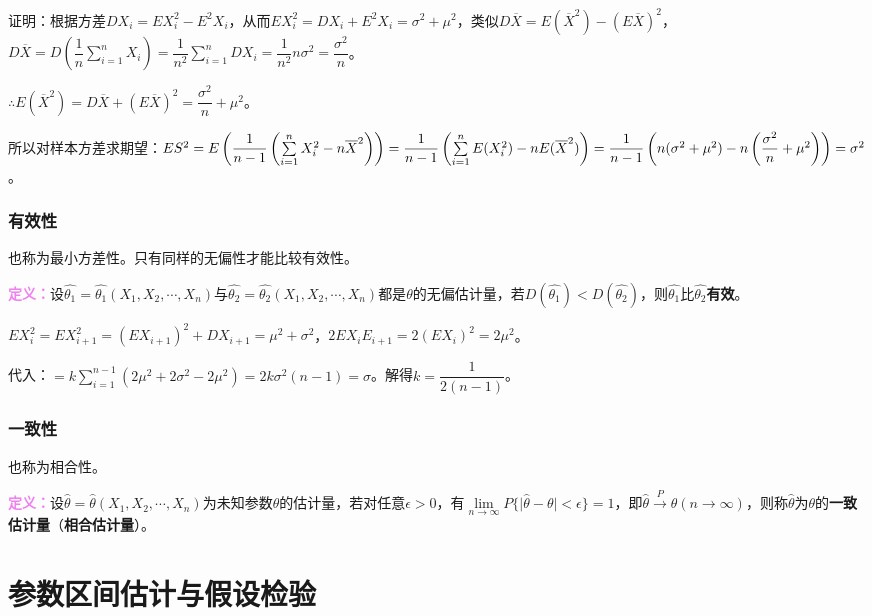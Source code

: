 \documentclass[UTF8, 12pt]{ctexart}
\begin{document}
证明：根据方差$DX_i=EX_i^2-E^2X_i$，从而$EX_i^2=DX_i+E^2X_i=\sigma^2+\mu^2$，类似$D\overline{X}=E(\overline{X}^2)-(E\overline{X})^2$，$D\overline{X}=D\left(\dfrac{1}{n}\sum\limits_{i=1}^nX_i\right)=\dfrac{1}{n^2}\sum\limits_{i=1}^nDX_i=\dfrac{1}{n^2}n\sigma^2=\dfrac{\sigma^2}{n}$。

$\therefore E(\overline{X}^2)=D\overline{X}+(E\overline{X})^2=\dfrac{\sigma^2}{n}+\mu^2$。

所以对样本方差求期望：$ES^2=E\left(\dfrac{1}{n-1}\left(\sum\limits_{i=1}^nX_i^2-n\overline{X}^2\right)\right)=\dfrac{1}{n-1}\\\left(\sum\limits_{i=1}^nE(X_i^2)-nE(\overline{X}^2)\right)=\dfrac{1}{n-1}\left(n(\sigma^2+\mu^2)-n\left(\dfrac{\sigma^2}{n}+\mu^2\right)\right)=\sigma^2$。

\subsubsection{有效性}

也称为最小方差性。只有同样的无偏性才能比较有效性。

\textcolor{violet}{\textbf{定义：}}设$\hat{\theta_1}=\hat{\theta_1}(X_1,X_2,\cdots,X_n)$与$\hat{\theta_2}=\hat{\theta_2}(X_1,X_2,\cdots,X_n)$都是$\theta$的无偏估计量，若$D(\hat{\theta_1})<D(\hat{\theta_2})$，则$\hat{\theta_1}$比$\hat{\theta_2}$\textbf{有效}。

$EX_i^2=EX_{i+1}^2=(EX_{i+1})^2+DX_{i+1}=\mu^2+\sigma^2$，$2EX_iE_{i+1}=2(EX_i)^2=2\mu^2$。

代入：$=k\sum\limits_{i=1}^{n-1}(2\mu^2+2\sigma^2-2\mu^2)=2k\sigma^2(n-1)=\sigma$。解得$k=\dfrac{1}{2(n-1)}$。

\subsubsection{一致性}

也称为相合性。

\textcolor{violet}{\textbf{定义：}}设$\hat{\theta}=\hat{\theta}(X_1,X_2,\cdots,X_n)$为未知参数$\theta$的估计量，若对任意$\epsilon>0$，有$\lim\limits_{n\to\infty}P\{\vert\hat{\theta}-\theta\vert<\epsilon\}=1$，即$\hat{\theta}\overset{P}{\longrightarrow}\theta(n\to\infty)$，则称$\hat{\theta}$为$\theta$的\textbf{一致估计量}（\textbf{相合估计量}）。

\section{参数区间估计与假设检验}
\end{document}
